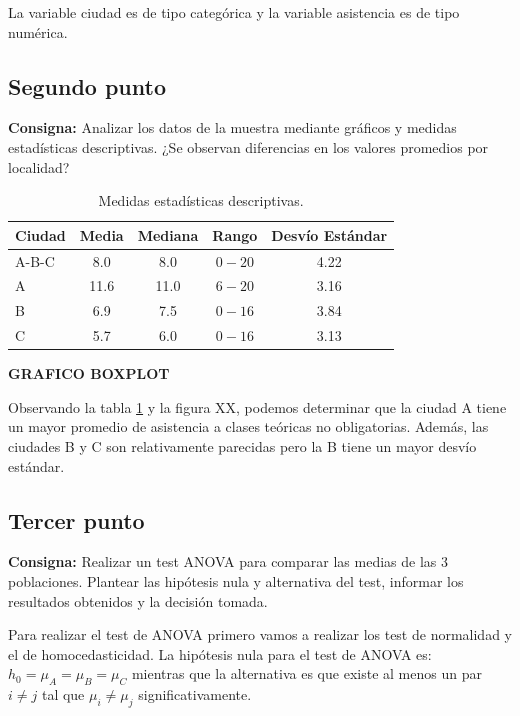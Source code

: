 \documentclass{article} %
\begin{document}
La variable ciudad es de tipo categórica y la variable asistencia es de tipo numérica.

\subsection{Segundo punto}

\textbf{Consigna:} Analizar los datos de la muestra mediante gráficos y medidas estadísticas descriptivas. ¿Se observan diferencias en los valores promedios por localidad?

\begin{table}[H]
	\centering
		\begin{tabular}{||l || c | c | c | c ||}
			\hline
			\hline
			Ciudad & Media & Mediana & Rango & Desvío Estándar\\
			\hline			
			\hline
			A-B-C & 8.0 & 8.0 & $0-20$ & 4.22\\
			\hline
			A & 11.6 & 11.0 & $6-20$ & 3.16\\
			\hline
			B & 6.9 & 7.5 & $0-16$ & 3.84\\
			\hline
			C & 5.7 & 6.0 & $0-16$ & 3.13\\
			\hline
			\hline
		\end{tabular}
		\caption{Medidas estadísticas descriptivas.}
	\label{tab:table-punto-4-2}
\end{table}

\textbf{GRAFICO BOXPLOT}

Observando la tabla \ref{tab:table-punto-4-2} y la figura XX, podemos determinar que la ciudad A tiene un mayor promedio de asistencia a clases teóricas no obligatorias. Además, las ciudades B y C son relativamente parecidas pero la B tiene un mayor desvío estándar.

\subsection{Tercer punto}

\textbf{Consigna:} Realizar un test ANOVA para comparar las medias de las 3 poblaciones. Plantear las hipótesis nula y alternativa del test, informar los resultados obtenidos y la decisión tomada.

Para realizar el test de ANOVA primero vamos a realizar los test de normalidad y el de homocedasticidad. La hipótesis nula para el test de ANOVA es: $h_0=\mu_A=\mu_B=\mu_C$ mientras que la alternativa es que existe al menos un par $i\neq j$ tal que $\mu_i \neq \mu _j$ significativamente.
\end{document}

